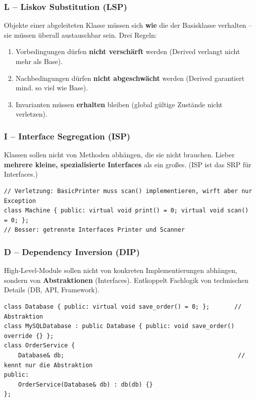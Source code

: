 \subsubsection*{L -- Liskov Substitution (LSP)}
Objekte einer abgeleiteten Klasse m\"ussen sich \textbf{wie} die der Basisklasse verhalten -- sie m\"ussen \"uberall austauschbar sein. Drei Regeln:
\begin{enumerate}
  \item Vorbedingungen d\"urfen \textbf{nicht versch\"arft} werden (Derived verlangt nicht mehr als Base).
  \item Nachbedingungen d\"urfen \textbf{nicht abgeschw\"acht} werden (Derived garantiert mind. so viel wie Base).
  \item Invarianten m\"ussen \textbf{erhalten} bleiben (global g\"ultige Zust\"ande nicht verletzen).
\end{enumerate}

\subsubsection*{I -- Interface Segregation (ISP)}
Klassen sollen nicht von Methoden abh\"angen, die sie nicht brauchen. Lieber \textbf{mehrere kleine, spezialisierte Interfaces} als ein gro\ss es. (ISP ist das SRP f\"ur Interfaces.)
\begin{lstlisting}
// Verletzung: BasicPrinter muss scan() implementieren, wirft aber nur Exception
class Machine { public: virtual void print() = 0; virtual void scan() = 0; };
// Besser: getrennte Interfaces Printer und Scanner
\end{lstlisting}

\subsubsection*{D -- Dependency Inversion (DIP)}
High-Level-Module sollen nicht von konkreten Implementierungen abh\"angen, sondern von \textbf{Abstraktionen} (Interfaces). Entkoppelt Fachlogik von technischen Details (DB, API, Framework).
\begin{lstlisting}
class Database { public: virtual void save_order() = 0; };       // Abstraktion
class MySQLDatabase : public Database { public: void save_order() override {} };
class OrderService {
    Database& db;                                                 // kennt nur die Abstraktion
public:
    OrderService(Database& db) : db(db) {}
};
\end{lstlisting}

